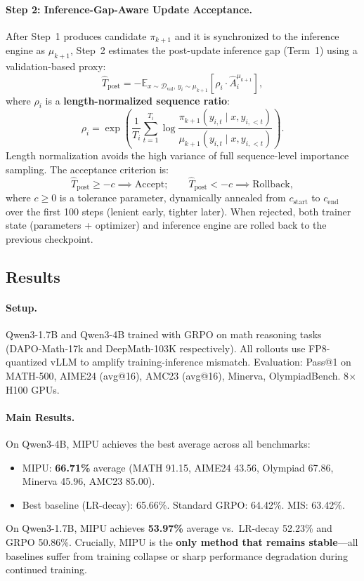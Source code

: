 \documentclass[11pt,a4paper]{article}
\begin{document}
\paragraph{Step 2: Inference-Gap-Aware Update Acceptance.} After Step~1 produces candidate $\pi_{k+1}$ and it is synchronized to the inference engine as $\mu_{k+1}$, Step~2 estimates the post-update inference gap (Term~1) using a validation-based proxy:
\[
\hat{T}_{\mathrm{post}} = -\mathbb{E}_{x \sim \mathcal{D}_{\mathrm{val}},\, y_i \sim \mu_{k+1}} \left[ \rho_i \cdot \hat{A}_i^{\mu_{k+1}} \right],
\]
where $\rho_i$ is a \textbf{length-normalized sequence ratio}:
\[
\rho_i = \exp\!\left( \frac{1}{T_i} \sum_{t=1}^{T_i} \log \frac{\pi_{k+1}(y_{i,t} \mid x, y_{i,<t})}{\mu_{k+1}(y_{i,t} \mid x, y_{i,<t})} \right).
\]
Length normalization avoids the high variance of full sequence-level importance sampling. The acceptance criterion is:
\[
\hat{T}_{\mathrm{post}} \geq -c \implies \mathrm{Accept}; \qquad \hat{T}_{\mathrm{post}} < -c \implies \mathrm{Rollback},
\]
where $c \geq 0$ is a tolerance parameter, dynamically annealed from $c_{\mathrm{start}}$ to $c_{\mathrm{end}}$ over the first 100 steps (lenient early, tighter later). When rejected, both trainer state (parameters + optimizer) and inference engine are rolled back to the previous checkpoint.

\subsection{Results}

\paragraph{Setup.} Qwen3-1.7B and Qwen3-4B trained with GRPO on math reasoning tasks (DAPO-Math-17k and DeepMath-103K respectively). All rollouts use FP8-quantized vLLM to amplify training-inference mismatch. Evaluation: Pass@1 on MATH-500, AIME24 (avg@16), AMC23 (avg@16), Minerva, OlympiadBench. 8$\times$ H100 GPUs.

\paragraph{Main Results.} On Qwen3-4B, MIPU achieves the best average across all benchmarks:
\begin{itemize}
\item MIPU: \textbf{66.71\%} average (MATH 91.15, AIME24 43.56, Olympiad 67.86, Minerva 45.96, AMC23 85.00).
\item Best baseline (LR-decay): 65.66\%. Standard GRPO: 64.42\%. MIS: 63.42\%.
\end{itemize}
On Qwen3-1.7B, MIPU achieves \textbf{53.97\%} average vs.\ LR-decay 52.23\% and GRPO 50.86\%. Crucially, MIPU is the \textbf{only method that remains stable}---all baselines suffer from training collapse or sharp performance degradation during continued training.
\end{document}
